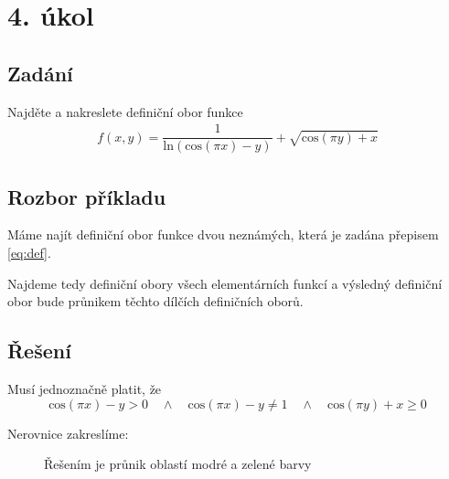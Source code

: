 \section{4. úkol}
\subsection*{Zadání}
Najděte a nakreslete definiční obor funkce 
\begin{eqnarray}f(x,y) = \dfrac{1}{\mathrm{ln}(\mathrm{cos}(\pi x) - y)} + \sqrt{\mathrm{cos}(\pi y) + x}
\label{eq:def}
\end{eqnarray}
\subsection*{Rozbor příkladu}
Máme najít definiční obor funkce dvou neznámých, která je zadána přepisem \ref{eq:def}. 

Najdeme tedy definiční obory všech elementárních funkcí a výsledný definiční obor bude průnikem těchto dílčích definičních oborů.

\subsection*{Řešení}
Musí jednoznačně platit, že
\begin{displaymath}
\mbox{cos}(\pi x) - y  > 0 \quad \wedge \quad \mbox{cos}(\pi x) - y \neq 1 \quad \wedge \quad \mbox{cos}(\pi y) + x \geq 0
\end{displaymath}

\noindent Nerovnice zakreslíme:

\begin{figure}[H]
	\centering
	
	\caption{Řešením je průnik oblastí modré a zelené barvy}
\end{figure}
